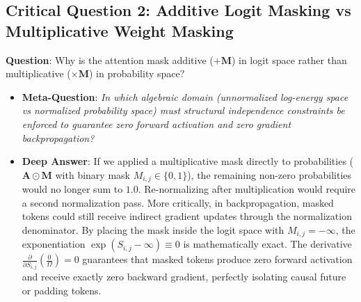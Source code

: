 \documentclass[11pt,a4paper]{article}
\theoremstyle{definition}
\begin{document}
\subsection{\textbf{Critical Question 2: Additive Logit Masking vs Multiplicative Weight Masking}}
\textbf{Question}: Why is the attention mask additive ($+\mathbf{M}$) in logit space rather than multiplicative ($\times \mathbf{M}$) in probability space?
\begin{itemize}
    \item \textbf{Meta-Question}: \emph{In which algebraic domain (unnormalized log-energy space vs normalized probability space) must structural independence constraints be enforced to guarantee zero forward activation and zero gradient backpropagation?}
    \item \textbf{Deep Answer}: If we applied a multiplicative mask directly to probabilities ($\mathbf{A} \odot \mathbf{M}$ with binary mask $M_{i, j} \in \{0, 1\}$), the remaining non-zero probabilities would no longer sum to $1.0$. Re-normalizing after multiplication would require a second normalization pass. More critically, in backpropagation, masked tokens could still receive indirect gradient updates through the normalization denominator. By placing the mask inside the logit space with $M_{i, j} = -\infty$, the exponentiation $\exp(S_{i, j} - \infty) \equiv 0$ is mathematically exact. The derivative $\frac{\partial}{\partial S_{i, j}}\left(\frac{0}{\Omega}\right) = 0$ guarantees that masked tokens produce zero forward activation and receive exactly zero backward gradient, perfectly isolating causal future or padding tokens.
\end{itemize}
\end{document}
